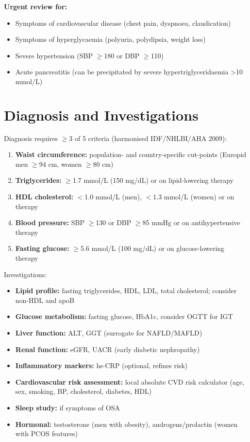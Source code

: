 \textbf{Urgent review for:}
\begin{itemize}
    \item Symptoms of cardiovascular disease (chest pain, dyspnoea, claudication)
    \item Symptoms of hyperglycaemia (polyuria, polydipsia, weight loss)
    \item Severe hypertension (SBP $\ge$180 or DBP $\ge$110)
    \item Acute pancreatitis (can be precipitated by severe hypertriglyceridaemia >10 mmol/L)
\end{itemize}

\section*{Diagnosis and Investigations}
Diagnosis requires $\ge$3 of 5 criteria (harmonised IDF/NHLBI/AHA 2009):
\begin{enumerate}
    \item \textbf{Waist circumference:} population- and country-specific cut-points (Europid men $\ge$94 cm, women $\ge$80 cm)
    \item \textbf{Triglycerides:} $\ge$1.7 mmol/L (150 mg/dL) or on lipid-lowering therapy
    \item \textbf{HDL cholesterol:} $<$1.0 mmol/L (men), $<$1.3 mmol/L (women) or on therapy
    \item \textbf{Blood pressure:} SBP $\ge$130 or DBP $\ge$85 mmHg or on antihypertensive therapy
    \item \textbf{Fasting glucose:} $\ge$5.6 mmol/L (100 mg/dL) or on glucose-lowering therapy
\end{enumerate}
Investigations:
\begin{itemize}
    \item \textbf{Lipid profile:} fasting triglycerides, HDL, LDL, total cholesterol; consider non-HDL and apoB
    \item \textbf{Glucose metabolism:} fasting glucose, HbA1c, consider OGTT for IGT
    \item \textbf{Liver function:} ALT, GGT (surrogate for NAFLD/MAFLD)
    \item \textbf{Renal function:} eGFR, UACR (early diabetic nephropathy)
    \item \textbf{Inflammatory markers:} hs-CRP (optional, refines risk)
    \item \textbf{Cardiovascular risk assessment:} local absolute CVD risk calculator (age, sex, smoking, BP, cholesterol, diabetes, HDL)
    \item \textbf{Sleep study:} if symptoms of OSA
    \item \textbf{Hormonal:} testosterone (men with obesity), androgens/prolactin (women with PCOS features)
\end{itemize}


